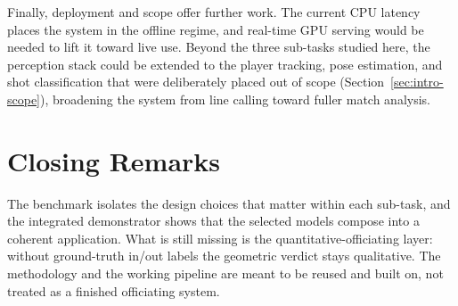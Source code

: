Finally, deployment and scope offer further work. The current CPU latency places the system in the offline regime, and real-time GPU serving would be needed to lift it toward live use. Beyond the three sub-tasks studied here, the perception stack could be extended to the player tracking, pose estimation, and shot classification that were deliberately placed out of scope (Section~\ref{sec:intro-scope}), broadening the system from line calling toward fuller match analysis.

\section{Closing Remarks}
\label{sec:concl-closing}

The benchmark isolates the design choices that matter within each sub-task, and the integrated demonstrator shows that the selected models compose into a coherent application. What is still missing is the quantitative-officiating layer: without ground-truth in/out labels the geometric verdict stays qualitative. The methodology and the working pipeline are meant to be reused and built on, not treated as a finished officiating system.
